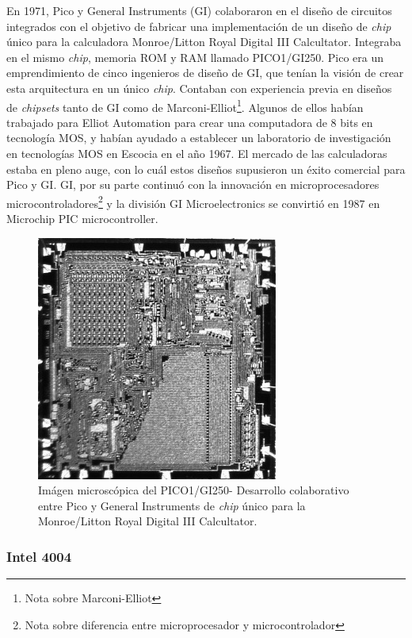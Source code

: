 En 1971, Pico y General Instruments (GI) colaboraron en el diseño de circuitos integrados con el objetivo de fabricar una implementación de un diseño de \emph{chip} único para la calculadora Monroe/Litton Royal Digital III Calcultator. Integraba en el mismo \emph{chip}, memoria ROM y RAM llamado PICO1/GI250. Pico era un emprendimiento de cinco ingenieros de diseño de GI, que tenían la visión de crear esta arquitectura en un único \emph{chip}. Contaban con experiencia previa en diseños de \emph{chipsets} tanto de GI como de Marconi-Elliot\footnote{Nota sobre Marconi-Elliot}. Algunos de ellos habían trabajado para Elliot Automation para crear una computadora de 8 bits en tecnología MOS, y habían ayudado a establecer un laboratorio de investigación en tecnologías MOS en Escocia en el año 1967. El mercado de las calculadoras estaba en pleno auge, con lo cuál estos diseños supusieron un éxito comercial para Pico y GI. GI, por su parte continuó con la innovación en microprocesadores microcontroladores\footnote{Nota sobre diferencia entre microprocesador y microcontrolador} y la división GI Microelectronics se convirtió en 1987 en Microchip PIC microcontroller.

\begin{figure}
  \centering
  \includegraphics[scale=0.5]{./figures/C02-pico1_gi250}
  \captionsetup{justification=centering}
  \caption{Imágen microscópica del PICO1/GI250- Desarrollo colaborativo entre Pico y General Instruments de \emph{chip} único para la Monroe/Litton Royal Digital III Calcultator.}
  \label{fig:C02-pico1_gi250}
\end{figure}

\subsubsection{Intel 4004}

